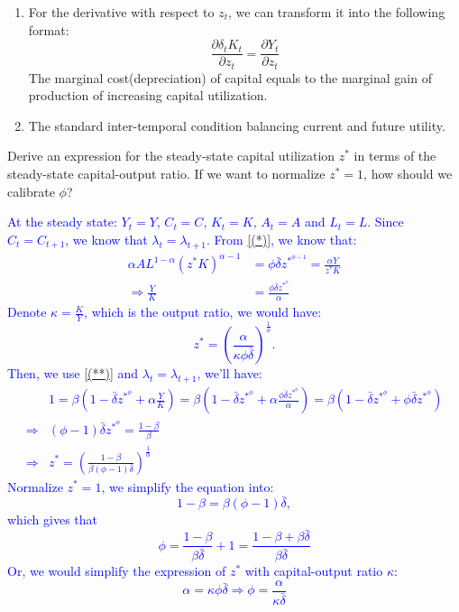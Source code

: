 \begin{solution}
{\begin{enumerate}
            \item For the derivative with respect to $z_t$, we can transform it into the following format:
            \[
            \frac{\partial \delta_t K_t}{\partial z_t} = \frac{\partial Y_t}{\partial z_t}
            \]
            The marginal cost(depreciation) of capital equals to the marginal gain of production of increasing capital utilization.
            \item The standard inter-temporal condition balancing current and future utility.
        \end{enumerate}
    }
\end{solution}

\begin{problem*}[3]
    Derive an expression for the steady-state capital utilization $z^*$ in terms of the steady-state capital-output ratio. If we want to normalize $z^*=1$, how should we calibrate $\phi$?
\end{problem*}

\begin{solution}
    \textcolor{blue}{
        At the steady state: $Y_t = Y$, $C_t = C$, $K_t = K$, $A_t = A$ and $L_t = L$.
        Since $C_t = C_{t+1}$, we know that $\lambda_t = \lambda_{t+1}.$
        From \ref{(*)}, we know that:
        \begin{align*}
            \alpha A L^{1-\alpha} (z^* K)^{\alpha-1} & = \phi \bar{\delta }z^{*^{\phi -1}} = \frac{\alpha Y}{z^* K} \\
            \Rightarrow \frac{Y}{K} & = \frac{\phi \bar{\delta} z^{*^{\phi }}}{\alpha}
        \end{align*}
        Denote $\kappa = \frac{K}{Y}$, which is the output ratio, we would have:
        \[
        z^* = \left( \frac{\alpha}{\kappa \phi \bar{\delta} }\right)^{\frac{1}{\phi}}.  
        \]
        Then, we use \ref{(**)} and $\lambda_t = \lambda_{t+1}$, we'll have:
        \begin{align*}
            & 1 = \beta(1 - \bar{\delta}z^{*^{\phi}} + \alpha \frac{Y}{K}) = \beta(1- \bar{\delta}z^{*^{\phi}} +\alpha \frac{\phi \bar{\delta} z^{*^{\phi }}}{\alpha} ) = \beta(1- \bar{\delta}z^{*^{\phi}} + \phi \bar{\delta} z^{*^{\phi }}) \\
            \Rightarrow & (\phi-1)\bar{\delta} z^{*^{\phi}} = \frac{1-\beta}{\beta} \\
            \Rightarrow & z^* = \left(\frac{1-\beta}{\beta (\phi-1) \bar{\delta}}\right)^{\frac{1}{\phi}}
        \end{align*}   
        Normalize $z^* = 1$, we simplify the equation into:
        \[
        1 - \beta = \beta (\phi-1) \bar{\delta},
        \]
        which gives that
        \[
        \phi = \frac{1-\beta}{\beta \bar{\delta}} + 1 = \frac{1 - \beta + \beta \bar{\delta}}{\beta \bar{\delta}}
        \]
        Or, we would simplify the expression of $z^*$ with capital-output ratio $\kappa$:
        \[
        \alpha = \kappa \phi \bar{\delta} \Rightarrow \phi = \frac{\alpha}{\kappa \bar{\delta}}
        \]
    }
\end{solution}

